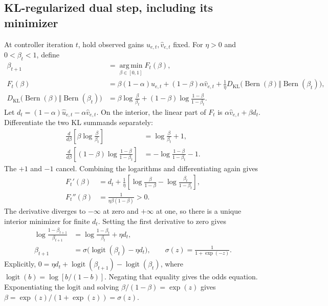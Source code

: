 \documentclass[11pt]{article}
\newcommand{\KL}{D_{\mathrm{KL}}}
\begin{document}
\subsection{KL-regularized dual step, including its minimizer}

At controller iteration $t$, hold observed gains $\widehat u_{e,t},\widehat v_{e,t}$ fixed. For $\eta>0$ and $0<\beta_t<1$, define
\begin{align}
 \beta_{t+1}&=\operatorname*{arg\,min}_{\beta\in[0,1]}F_t(\beta),\\
 F_t(\beta)&=\beta(1-\alpha)\widehat u_{e,t}
 +(1-\beta)\alpha\widehat v_{e,t}
 +\frac1\eta\KL\bigl(\operatorname{Bern}(\beta)\Vert
                              \operatorname{Bern}(\beta_t)\bigr),\label{eq:mirror}\\
 \KL\bigl(\operatorname{Bern}(\beta)\Vert\operatorname{Bern}(\beta_t)\bigr)
 &=\beta\log\frac{\beta}{\beta_t}
 +(1-\beta)\log\frac{1-\beta}{1-\beta_t}.
\end{align}
Let $d_t=(1-\alpha)\widehat u_{e,t}-\alpha\widehat v_{e,t}$. On the interior,
the linear part of $F_t$ is $\alpha\widehat v_{e,t}+\beta d_t$. Differentiate the two KL summands separately:
\begin{align}
 \frac{d}{d\beta}\left[\beta\log\frac{\beta}{\beta_t}\right]
   &=\log\frac{\beta}{\beta_t}+1,\\
 \frac{d}{d\beta}\left[(1-\beta)\log\frac{1-\beta}{1-\beta_t}\right]
   &=-\log\frac{1-\beta}{1-\beta_t}-1.
\end{align}
The $+1$ and $-1$ cancel. Combining the logarithms and differentiating again gives
\begin{align}
 F_t'(\beta)&=d_t+\frac1\eta\left[
           \log\frac{\beta}{1-\beta}-\log\frac{\beta_t}{1-\beta_t}\right],\\
 F_t''(\beta)&=\frac1{\eta\beta(1-\beta)}>0.
\end{align}
The derivative diverges to $-\infty$ at zero and $+\infty$ at one, so there is a unique interior minimizer for finite $d_t$. Setting the first derivative to zero gives
\begin{align}
 \log\frac{1-\beta_{t+1}}{\beta_{t+1}}
 &=\log\frac{1-\beta_t}{\beta_t}+\eta d_t,\label{eq:odds}\\
 \beta_{t+1}&=\sigma\bigl(\operatorname{logit}(\beta_t)-\eta d_t\bigr),
 \qquad \sigma(z)=\frac1{1+\exp(-z)}.
\end{align}
Explicitly, $0=\eta d_t+\operatorname{logit}(\beta_{t+1})-\operatorname{logit}(\beta_t)$, where $\operatorname{logit}(b)=\log[b/(1-b)]$. Negating that equality gives the odds equation. Exponentiating the logit and solving $\beta/(1-\beta)=\exp(z)$ gives $\beta=\exp(z)/(1+\exp(z))=\sigma(z)$.
\end{document}
